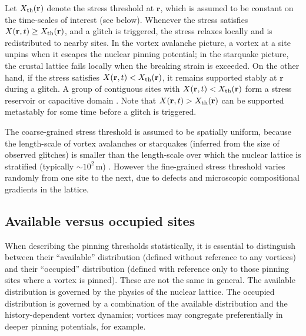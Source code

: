 Let $X_{\rm th}(\mathbf{r})$ denote the stress threshold at $\mathbf{r}$, which is assumed to be constant on the time-scales of interest (see below). Whenever the stress satisfies $X(\mathbf{r}, t) \geq X_{\rm th}(\mathbf{r})$, and a glitch is triggered, the stress relaxes locally and is redistributed to nearby sites. In the vortex avalanche picture, a vortex at a site unpins when it escapes the nuclear pinning potential; in the starquake picture, the crustal lattice fails locally when the breaking strain is exceeded. On the other hand, if the stress satisfies $X(\mathbf{r}, t) < X_{\rm th}(\mathbf{r})$, it remains supported stably at $\mathbf{r}$ during a glitch. A group of contiguous sites with $X(\mathbf{r}, t) < X_{\rm th}(\mathbf{r})$ form a stress reservoir or capacitive domain \citep{Alpar1996}. Note that $X(\mathbf{r}, t) > X_{\rm th}(\mathbf{r})$ can be supported metastably for some time before a glitch is triggered.

The coarse-grained stress threshold is assumed to be spatially uniform, because the length-scale of vortex avalanches or starquakes (inferred from the size of observed glitches) is smaller than the length-scale over which the nuclear lattice is stratified (typically $\sim10^2\,$m) \citep{Chamel2008}. However the fine-grained stress threshold varies randomly from one site to the next, due to defects and microscopic compositional gradients in the lattice. 

\subsection{Available versus occupied sites} \label{sec:hda_g_intro}
When describing the pinning thresholds statistically, it is essential to distinguish between their ``available'' distribution (defined without reference to any vortices) and their ``occupied'' distribution (defined with reference only to those pinning sites where a vortex is pinned). These are not the same in general. The available distribution is governed by the physics of the nuclear lattice. The occupied distribution is governed by a combination of the available distribution and the history-dependent vortex dynamics; vortices may congregate preferentially in deeper pinning potentials, for example.

